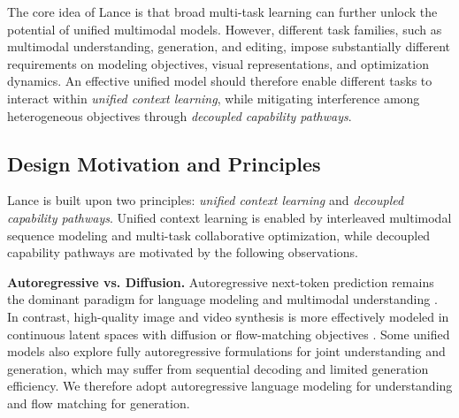 \documentclass{llmxive}
\begin{document}
The core idea of Lance is that broad multi-task learning can further unlock the potential of unified multimodal models. However, different task families, such as multimodal understanding, generation, and editing, impose substantially different requirements on modeling objectives, visual representations, and optimization dynamics. An effective unified model should therefore enable different tasks to interact within \textit{unified context learning}, while mitigating interference among heterogeneous objectives through \textit{decoupled capability pathways}.


\subsection{Design Motivation and Principles}



Lance is built upon two principles: \textit{unified context learning} and \textit{decoupled capability pathways}. 
Unified context learning is enabled by interleaved multimodal sequence modeling and multi-task collaborative optimization, while decoupled capability pathways are motivated by the following observations.

\textbf{Autoregressive vs. Diffusion.}
Autoregressive next-token prediction remains the dominant paradigm for language modeling \cite{touvron2023llama,achiam2023gpt,liu2024deepseek} and multimodal understanding \cite{Qwen3-VL,xu2024pllava,li2025videochat}. %
In contrast, high-quality image and video synthesis is more effectively modeled in continuous latent spaces with diffusion or flow-matching objectives \cite{ding2021cogview,li2023blip,cai2024diffusion_selfdistill,labs2025flux,wu2025qwen}. %
 Some unified models \cite{team2024chameleon,wu2024vila,wang2024emu3,qu2025tokenflow} also explore fully autoregressive formulations for joint understanding and generation, which may suffer from sequential decoding and limited generation efficiency. 
We therefore adopt autoregressive language modeling for understanding and flow matching for generation.
\end{document}
